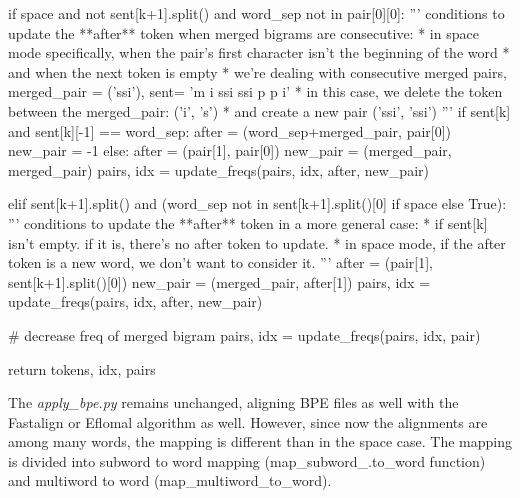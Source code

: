 \begin{python}
      if space and not sent[k+1].split() and word_sep not in pair[0][0]:
        '''
        conditions to update the **after** token when merged bigrams are consecutive:
        * in space mode specifically, when the pair's first character isn't the beginning of the word
        * and when the next token is empty
        * we're dealing with consecutive merged pairs, merged_pair = ('ssi'), sent= 'm i ssi ssi p p i'
            * in this case, we delete the token between the merged_pair: ('i', 's')
            * and create a new pair ('ssi', 'ssi')
        '''
        if sent[k] and sent[k][-1] == word_sep:
          after = (word_sep+merged_pair, pair[0])
          new_pair = -1
        else:
          after = (pair[1], pair[0])
          new_pair = (merged_pair, merged_pair)
          pairs, idx = update_freqs(pairs, idx, after, new_pair)

      elif sent[k+1].split() and (word_sep not in sent[k+1].split()[0] if space else True):
        '''
        conditions to update the **after** token in a more general case:
        * if sent[k] isn't empty. if it is, there's no after token to update.
        * in space mode, if the after token is a new word, we don't want to consider it.
        '''
        after = (pair[1], sent[k+1].split()[0])
        new_pair = (merged_pair, after[1])
        pairs, idx = update_freqs(pairs, idx, after, new_pair)

      # decrease freq of merged bigram
      pairs, idx = update_freqs(pairs, idx, pair)

  return tokens, idx, pairs
\end{python}

The \emph{apply\_bpe.py} remains unchanged, aligning BPE files as well with the Fastalign or Eflomal algorithm as well. However, since now the alignments are among many words, the mapping is different than in the space case. The mapping is divided into subword to word mapping (map\_subword\_.to\_word function) and multiword to word (map\_multiword\_to\_word).

